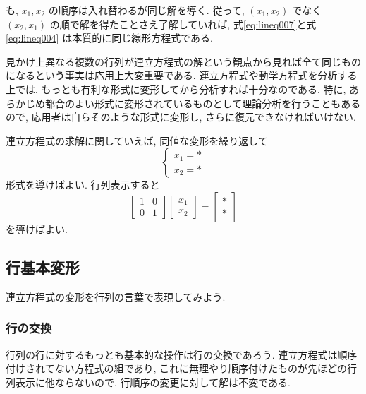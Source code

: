 \documentclass[a4paper]{scrbook}
\theoremstyle{definition}
\begin{document}
も, \(x_{1},x_{2}\) の順序は入れ替わるが同じ解を導く. 従って,
\((x_{1},x_{2})\) でなく \((x_{2},x_{1})\)
の順で解を得たことさえ了解していれば,
式\eqref{eq:lineq007}と式\eqref{eq:lineq004} は本質的に同じ線形方程式である.

見かけ上異なる複数の行列が連立方程式の解という観点から見れば全て同じものになるという事実は応用上大変重要である.
連立方程式や動学方程式を分析する上では,
もっとも有利な形式に変形してから分析すれば十分なのである. 特に,
あらかじめ都合のよい形式に変形されているものとして理論分析を行うこともあるので,
応用者は自らそのような形式に変形し, さらに復元できなければいけない.

連立方程式の求解に関していえば, 同値な変形を繰り返して \[
\begin{cases}
  x_{1}=*\\
  x_{2}=*
\end{cases}
\] 形式を導けばよい. 行列表示すると \[
\begin{bmatrix}
  1 & 0\\
  0 & 1
\end{bmatrix}
\begin{bmatrix}
  x_{1}\\
  x_{2}
\end{bmatrix}=\begin{bmatrix}*\\
*
\end{bmatrix}
\] を導けばよい.

\subsection{行基本変形}

連立方程式の変形を行列の言葉で表現してみよう.

\subsubsection*{行の交換}

行列の行に対するもっとも基本的な操作は行の交換であろう.
連立方程式は順序付けされてない方程式の組であり,
これに無理やり順序付けたものが先ほどの行列表示に他ならないので,
行順序の変更に対して解は不変である.
\end{document}
